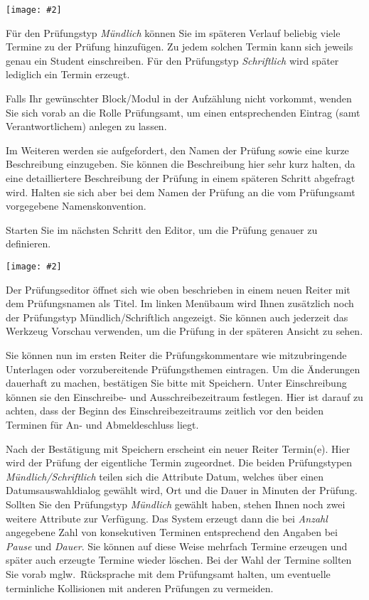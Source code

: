 \documentclass[a4paper,11pt]{article}
\newcommand{\bild}[2]{
    \begin{center}\texttt{[image: \#2]}\end{center}
}
\newcommand{\knopf}[1]{{\sc #1}}
\begin{document}
\bild{.9}{Pruefung-Erzeugen-Typ}

Für den Prüfungstyp {\em Mündlich} können Sie im späteren Verlauf beliebig
viele Termine zu der Prüfung hinzufügen. Zu jedem solchen Termin kann sich
jeweils genau ein Student einschreiben.  Für den Prüfungstyp {\em Schriftlich}
wird später lediglich ein Termin erzeugt.

Falls Ihr gewünschter Block/Modul in der Aufzählung nicht vorkommt, wenden Sie
sich vorab an die Rolle Prüfungsamt, um einen entsprechenden Eintrag (samt
Verantwortlichem) anlegen zu lassen.

Im Weiteren werden sie aufgefordert, den Namen der Prüfung sowie eine kurze
Beschreibung einzugeben. Sie können die Beschreibung hier sehr kurz halten, da
eine detailliertere Beschreibung der Prüfung in einem späteren Schritt
abgefragt wird. Halten sie sich aber bei dem Namen der Prüfung an die vom
Prüfungsamt vorgegebene Namenskonvention. 

Starten Sie im nächsten Schritt den Editor, um die Prüfung genauer zu
definieren.

\bild{.9}{Pruefung-Erzeugen-Editor}

Der Prüfungseditor öffnet sich wie oben beschrieben in einem neuen Reiter mit
dem Prüfungsnamen als Titel. Im linken Menübaum wird Ihnen zusätzlich noch der
Prüfungstyp \knopf{Mündlich/Schriftlich} angezeigt. Sie können auch jederzeit
das Werkzeug \knopf{Vorschau} verwenden, um die Prüfung in der späteren
Ansicht zu sehen.

Sie können nun im ersten Reiter die Prüfungskommentare wie mitzubringende
Unterlagen oder vorzubereitende Prüfungsthemen eintragen. Um die Änderungen
dauerhaft zu machen, bestätigen Sie bitte mit \knopf{Speichern}. Unter
\knopf{Einschreibung} können sie den Einschreibe- und Ausschreibezeitraum
festlegen. Hier ist darauf zu achten, dass der Beginn des Einschreibezeitraums
zeitlich vor den beiden Terminen für An- und Abmeldeschluss liegt.

Nach der Bestätigung mit \knopf{Speichern} erscheint ein neuer Reiter
\knopf{Termin(e)}. Hier wird der Prüfung der eigentliche Termin zugeordnet.
Die beiden Prüfungstypen {\em Mündlich/Schriftlich} teilen sich die Attribute
Datum, welches über einen Datumsauswahldialog gewählt wird, Ort und die Dauer
in Minuten der Prüfung. Sollten Sie den Prüfungstyp {\em Mündlich} gewählt
haben, stehen Ihnen noch zwei weitere Attribute zur Verfügung. Das System
erzeugt dann die bei {\em Anzahl} angegebene Zahl von konsekutiven Terminen
entsprechend den Angaben bei {\em Pause} und {\em Dauer}.  Sie können auf
diese Weise mehrfach Termine erzeugen und später auch erzeugte Termine wieder
löschen.  Bei der Wahl der Termine sollten Sie vorab mglw.\ Rücksprache mit
dem Prüfungsamt halten, um eventuelle terminliche Kollisionen mit anderen
Prüfungen zu vermeiden.
\end{document}
